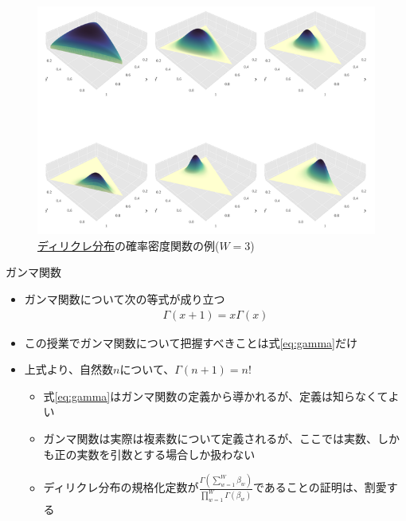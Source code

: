 \documentclass[aspectratio=169,unicode,dvipdfmx,14pt]{beamer}
\begin{document}
\begin{frame}
\begin{figure}[htbp]
\begin{center}
\includegraphics[scale=0.42]{Dirichlet-3d-panel}
\caption{\href{https://en.wikipedia.org/wiki/Dirichlet_distribution}{ディリクレ分布}の確率密度関数の例($W=3$)}
\label{}
\end{center}
\end{figure}
\end{frame}


\begin{frame}{ガンマ関数}
\begin{itemize}
\item ガンマ関数について次の等式が成り立つ
\begin{align}
\Gamma(x+1)=x\Gamma(x) 
\label{eq:gamma}
\end{align}
\item この授業でガンマ関数について把握すべきことは式\eqref{eq:gamma}だけ
\item 上式より、自然数$n$について、$\Gamma(n+1)=n!$
\begin{itemize}
\item 式\eqref{eq:gamma}はガンマ関数の定義から導かれるが、定義は知らなくてよい
\item ガンマ関数は実際は複素数について定義されるが、ここでは実数、しかも正の実数を引数とする場合しか扱わない
\item ディリクレ分布の規格化定数が$\frac{\Gamma(\sum_{w=1}^W \beta_w)}{\prod_{w=1}^W\Gamma(\beta_w)}$であることの証明は、割愛する
\end{itemize}
\end{itemize}
\end{frame}
\end{document}
